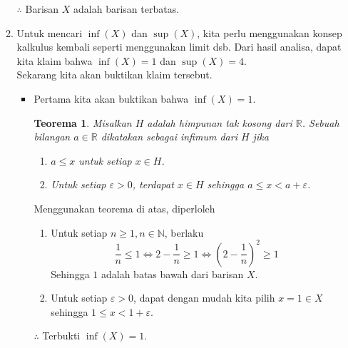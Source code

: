\documentclass[10pt,openany,a4paper]{article}
\newcommand{\R}{\mathbb{R}}
\newcommand{\N}{\mathbb{N}}
\newtheorem*{teorema}{Teorema}
\begin{document}
\begin{enumerate}
\begin{enumerate}
                    $\therefore$ Barisan $X$ adalah barisan terbatas.

              \item Untuk mencari $\inf(X)$ dan $\sup(X)$, kita perlu menggunakan konsep kalkulus kembali seperti menggunakan limit dsb. Dari hasil analisa, dapat kita klaim bahwa $\inf(X)=1$ dan $\sup(X)=4$.\\

                    Sekarang kita akan buktikan klaim tersebut.
                    \begin{itemize}
                        \item Pertama kita akan buktikan bahwa $\inf(X)=1$.
                              \begin{teorema}
                                  Misalkan $H$ adalah himpunan tak kosong dari $\R$. Sebuah bilangan $a\in\R$ dikatakan sebagai infimum dari $H$ jika
                                  \begin{enumerate}
                                      \item $a\leq x$ untuk setiap $x\in H$.
                                      \item Untuk setiap $\varepsilon>0$, terdapat $x\in H$ sehingga $a\leq x<a+\varepsilon$.\\
                                  \end{enumerate}
                              \end{teorema}

                              Menggunakan teorema di atas, diperloleh
                              \begin{enumerate}
                                  \item Untuk setiap $n\geq 1,n\in\N$, berlaku
                                        \[\frac{1}{n}\leq 1\iff 2-\frac{1}{n}\geq 1\iff \left(2-\frac{1}{n}\right)^2\geq 1\]
                                        Sehingga $1$ adalah batas bawah dari barisan $X$.
                                  \item Untuk setiap $\varepsilon>0$, dapat dengan mudah kita pilih $x=1\in X$ sehingga $1\leq x<1+\varepsilon$.\\
                              \end{enumerate}

                              $\therefore$ Terbukti $\inf(X)=1$.\\


\end{itemize}
\end{enumerate}
\end{enumerate}
\end{document}
